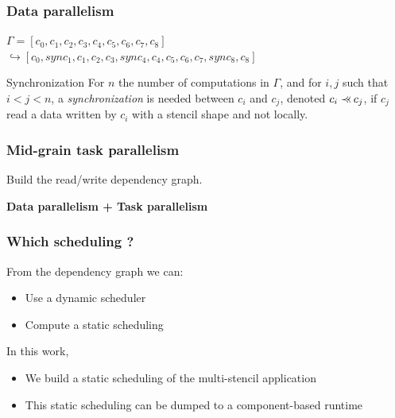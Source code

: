 \documentclass{beamer}
\def\pprec{\mathrel{\scalebox{.9}[1]{$\prec$}\mkern-3mu%
  \scalebox{.4}[1]{$\prec$}\mkern-5.5mu\scalebox{.4}[1]{$\prec$}}}
\begin{document}
\begin{frame}
\frametitle{Data parallelism}
$\Gamma = [c_0,c_1,c_2,c_3,c_4,c_5,c_6,c_7,c_8]$\\
$\hookrightarrow [c_0,sync_1,c_1,c_2,c_3,sync_4,c_4,c_5,c_6,c_7,sync_8,c_8]$

\medskip
\begin{block}{Synchronization}
For $n$ the number of computations in $\Gamma$, and for $i,j$ such that $i<j<n$, a \textit{synchronization} is needed between $c_i$ and $c_j$, denoted $c_i \pprec c_j$, if $c_j$ read a data written by $c_i$ with a stencil shape and not locally.
\end{block}
\end{frame}

\begin{frame}
\frametitle{Mid-grain task parallelism}

Build the read/write dependency graph.

\begin{center}
\end{center}

\begin{center}
\textbf{Data parallelism + Task parallelism}
\end{center}
\end{frame}

\begin{frame}
\frametitle{Which scheduling ?}
From the dependency graph we can:
\begin{itemize}
\item Use a dynamic scheduler
\item Compute a static scheduling
\end{itemize}

In this work,
\begin{itemize}
\item We build a static scheduling of the multi-stencil application
\item This static scheduling can be dumped to a component-based runtime
\end{itemize}
\end{frame}
\end{document}
